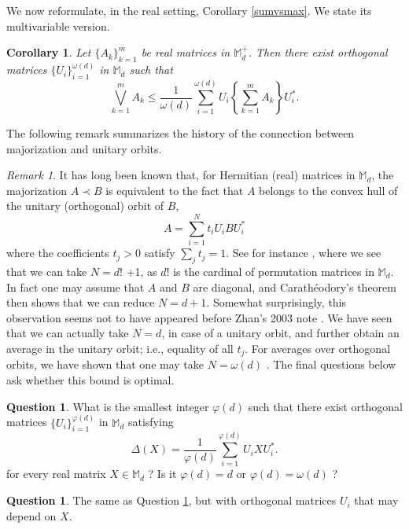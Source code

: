 \documentclass[12pt,reqno]{article}
\newtheorem{cor}[theorem]{Corollary}
\theoremstyle{definition}
\newtheorem{question}[theorem]{Question}
\theoremstyle{remark}
\newtheorem{remark}[theorem]{Remark}
\numberwithin{equation}{section}
\def\bM{\mathbb{M}}
\begin{document}
We now reformulate, in the real setting, Corollary \ref{sumvsmax}. We state its multivariable version.





\vskip 5pt
\begin{cor}\label{sumvsmaxreal} Let  $\{A_k\}_{k=1}^m$ be real matrices in $\bM_d^+$. Then there exist  orthogonal matrices $\{U_i\}_{i=1}^{\omega(d)}$ in $\bM_d$  such that 
$$
\bigvee_{k=1}^m A_k \le \frac{1}{\omega(d)}  \sum_{i=1}^{\omega(d)} U_i \left\{\sum_{k=1}^mA_k\right\}U_i^*.
$$
\end{cor}





\vskip 5pt
The following remark
summarizes the history of the connection between majorization and unitary orbits.

\vskip 5pt
\begin{remark} It has long been known that, for Hermitian (real) matrices in $\bM_d$, the majorization $A\prec B$ is equivalent to the fact that $A$ belongs to the convex
hull of the unitary (orthogonal) orbit of $B$,
$$
A=\sum_{i=1}^N t_i U_i BU_i^*
$$
where the coefficients $t_j>0$ satisfy $\sum_j t_j= 1$.
See for instance \cite[Theorem 7.1]{Ando}, where we see that we can take $N=d!$ +1, as $d!$ is the cardinal of permutation matrices in $\bM_d$.  In fact one may assume that $A$ and $B$ are diagonal, and Carathéodory's theorem then shows that we can reduce   $N=d+1$. Somewhat surprisingly, this observation seems not to have appeared before Zhan's 2003 note \cite{Zhan}. We have seen that   we can actually take $N=d$, in case of a unitary orbit, and further  obtain an average in the unitary orbit; i.e.,  equality of all $t_j$. For averages over orthogonal orbits, we have shown that one may take $N=\omega(d)$ . The final questions below ask whether this bound is optimal.
\end{remark}


\begin{question}\label{qf1} What is the smallest integer $\varphi(d)$ such that there exist orthogonal matrices  $\{U_i\}_{i=1}^{\varphi(d)}$ in $\bM_d$ satisfying
$$
\Delta(X) =\frac{1}{\varphi(d)}\sum_{i=1}^{\varphi(d)} U_iXU_i^*.
$$
for every real matrix $X\in\bM_d$ ?
Is it $\varphi(d)=d$  or $\varphi(d)=\omega(d)$ ?
\end{question}

\begin{question}\label{qf2} The same as Question \ref{qf1}, but with orthogonal matrices $U_i$ that may depend on $X.$
\end{question}
\end{document}
